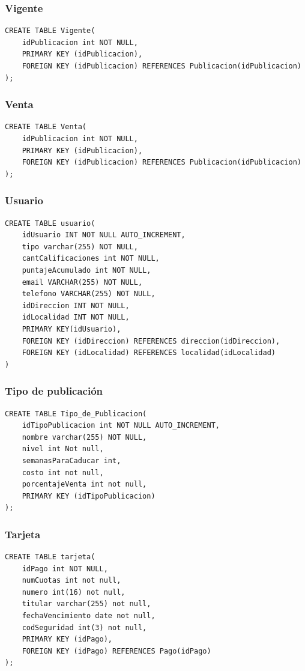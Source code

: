 \documentclass[a4paper, 10pt, twoside]{article}
\begin{document}
\subsubsection{Vigente}
\begin{verbatim}
CREATE TABLE Vigente(
	idPublicacion int NOT NULL,
	PRIMARY KEY (idPublicacion),
    FOREIGN KEY (idPublicacion) REFERENCES Publicacion(idPublicacion)
);
\end{verbatim}
\subsubsection{Venta}
\begin{verbatim}
CREATE TABLE Venta(
	idPublicacion int NOT NULL,
	PRIMARY KEY (idPublicacion),
    FOREIGN KEY (idPublicacion) REFERENCES Publicacion(idPublicacion)
);
\end{verbatim}

\subsubsection{Usuario}
\begin{verbatim}
CREATE TABLE usuario(
	idUsuario INT NOT NULL AUTO_INCREMENT,
	tipo varchar(255) NOT NULL,
    cantCalificaciones int NOT NULL,
    puntajeAcumulado int NOT NULL,
    email VARCHAR(255) NOT NULL,
    telefono VARCHAR(255) NOT NULL,
    idDireccion INT NOT NULL,
    idLocalidad INT NOT NULL, 
    PRIMARY KEY(idUsuario),
    FOREIGN KEY (idDireccion) REFERENCES direccion(idDireccion),
    FOREIGN KEY (idLocalidad) REFERENCES localidad(idLocalidad)
)
\end{verbatim}
\subsubsection{Tipo de publicaci\'on}
\begin{verbatim}
CREATE TABLE Tipo_de_Publicacion(
	idTipoPublicacion int NOT NULL AUTO_INCREMENT,
    nombre varchar(255) NOT NULL,
    nivel int Not null,
    semanasParaCaducar int,
    costo int not null,
    porcentajeVenta int not null,
    PRIMARY KEY (idTipoPublicacion)
);
\end{verbatim}
\subsubsection{Tarjeta}
\begin{verbatim}
CREATE TABLE tarjeta(
	idPago int NOT NULL,
    numCuotas int not null,
    numero int(16) not null,
    titular varchar(255) not null,
    fechaVencimiento date not null,
    codSeguridad int(3) not null,
	PRIMARY KEY (idPago),
    FOREIGN KEY (idPago) REFERENCES Pago(idPago)
);
\end{verbatim}
\end{document}
